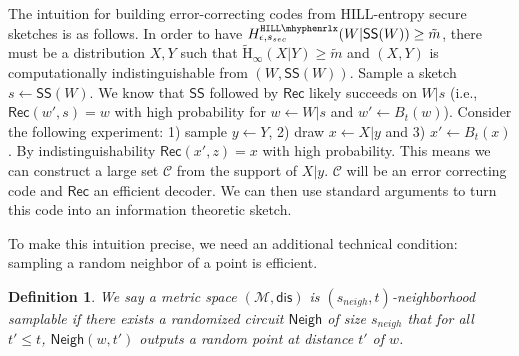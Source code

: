 \documentclass[11pt]{article}
\newcommand{\class}[1]{{\ensuremath{\mathsf{#1}}}}
\newcommand{\sketch}{\ensuremath{\class{SS}}\xspace}
\newcommand{\rec}{\ensuremath{\class{Rec}}\xspace}
\newcommand{\sample}{\ensuremath{\class{Sample}}\xspace}
\newcommand{\neigh}{\ensuremath{\class{Neigh}}\xspace}
\newcommand{\dis}{\ensuremath{\mathsf{dis}}}
\newcommand{\hillrlx}{\ensuremath{\mathtt{HILL\mhyphen rlx}}\xspace}
\newcommand{\Hav}{\tilde{\mathrm{H}}_\infty}
\newtheorem{definition}[theorem]{Definition}
\newcommand{\authnote}[2]{{\textcolor{red}{\textsf{#1 notes: }\textcolor{blue}{ #2}}\marginpar{\textcolor{red}{\textbf{!!!!!}}}}}
\newcommand{\authnote}[2]{}
\newcommand{\lnote}[1]{{\authnote{Leo}{#1}}}
\begin{document}
The intuition for building error-correcting codes from HILL-entropy secure sketches is as follows.  In order to have  $H^{\hillrlx}_{\epsilon, s_{sec}}(W|\sketch(W))\ge \tilde{m}$, there must be a distribution $X, Y$ such that $\Hav(X | Y)\geq \tilde{m}$ and $(X, Y)$ is computationally indistinguishable from $(W, \sketch(W))$.  Sample a sketch $s\leftarrow \sketch(W)$. We know that $\sketch$ followed by $\rec$ likely succeeds on $W|s$  (i.e., $\rec (w', s) = w$ with high probability for $w\leftarrow W|s$ and $w'\leftarrow B_t(w)$).  %
 Consider the following experiment: 1) sample $y\leftarrow Y$, 2) draw $x\leftarrow X|y$ and 3) $x'\leftarrow B_t(x)$. By indistinguishability $\rec (x',z) = x$ with high probability.
 This means we can construct a large set $\mathcal{C}$ from the support of $X|y$.  $\mathcal{C}$ will be an error correcting code and $\rec$ an efficient decoder.  We can then use standard arguments to turn this code into an information theoretic sketch.  


To make this intuition precise, we need an additional technical condition:  sampling a random neighbor of a point is efficient.
\begin{definition}
\label{def:neighborhood samplable}
We say a metric space $(\mathcal{M}, \dis)$ is $(s_{neigh}, t)$-\emph{neighborhood samplable} if there exists a randomized circuit $\neigh$ of size $s_{neigh}$ that for all $t'\leq t$, $\neigh (w, t')$ outputs a random point at distance $t'$ of $w$.  
\end{definition}
\end{document}
